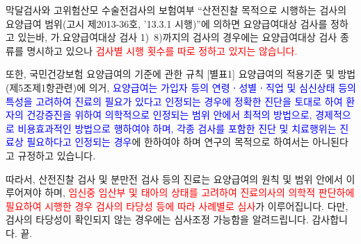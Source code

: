 \par
\medskip
\prezi{\clearpage}
\begin{commentbox}{막달검사와 고위험산모 수술전검사의 보험여부}
“산전진찰 목적으로 시행하는 검사의 요양급여 범위(고시 제2013-36호, ’13.3.1 시행)”에 의하면 요양급여대상 검사를 정하고 있는바, 가.요양급여대상 검사 1)~8)까지의 검사의 경우에는 요양급여대상 검사 종류를 명시하고 있으나 \textcolor{red}{검사별 시행 횟수를 따로 정하고 있지는 않습니다.}\par
또한, 국민건강보험 요양급여의 기준에 관한 규칙 [별표1] 요양급여의 적용기준 및 방법(제5조제1항관련)에 의거, \textcolor{blue}{요양급여는 가입자 등의 연령ㆍ성별ㆍ직업 및 심신상태 등의 특성을 고려하여 진료의 필요가 있다고 인정되는 경우에 정확한 진단을 토대로 하여 환자의 건강증진을 위하여 의학적으로 인정되는 범위 안에서 최적의 방법으로, 경제적으로 비용효과적인 방법으로 행하여야 하며, 각종 검사를 포함한 진단 및 치료행위는 진료상 필요하다고 인정되는 경우}에 한하여야 하며 연구의 목적으로 하여서는 아니된다고 규정하고 있습니다.\par
따라서, 산전진찰 검사 및 분만전 검사 등의 진료는 요양급여의 원칙 및 범위 안에서 이루어져야 하며, \textcolor{red}{임신중 임산부 및 태아의 상태를 고려하여 진료의사의 의학적 판단하에 필요하여 시행한 경우 검사의 타당성 등에 따라 사례별로 심사}가 이루어집니다. 다만, 검사의 타당성이 확인되지 않는 경우에는 심사조정 가능함을 알려드립니다. 감사합니다. 끝.
\end{commentbox}


